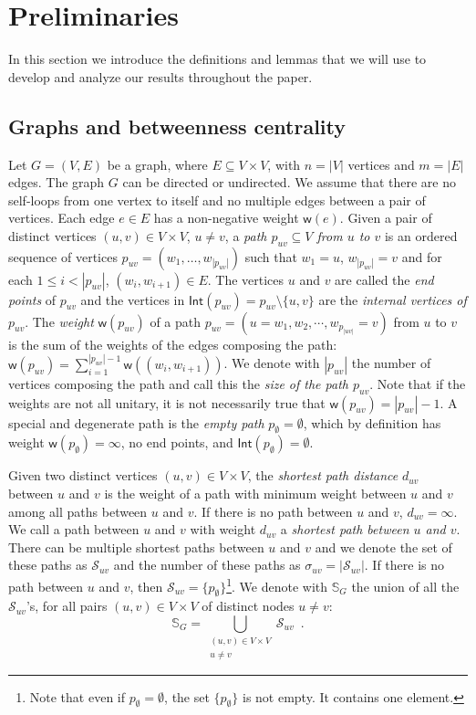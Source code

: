 \section{Preliminaries}\label{sec:prelims}
In this section we introduce the definitions and lemmas that we will use to
develop and analyze our results throughout the paper.

\subsection{Graphs and betweenness centrality}\label{sec:graphprelims}
Let $G=(V,E)$ be a graph, where $E\subseteq V\times V$, with $n=|V|$ vertices
and $m=|E|$ edges. The graph $G$ can be directed or undirected. We assume that
there are no self-loops from one vertex to itself and no multiple edges between
a pair of vertices. Each edge $e\in E$ has a non-negative weight
$\mathsf{w}(e)$. Given a pair of distinct vertices $(u,v)\in V\times V$,
$u\neq v$, a \emph{path $p_{uv}\subseteq V$ from $u$ to $v$} is an ordered sequence of
vertices $p_{uv}=(w_1,\dotsc,w_{|p_{uv}|})$ such that $w_1=u$, $w_{|p_{uv}|}=v$ and
for each $1\le i < |p_{uv}|$, $(w_i,w_{i+1})\in E$. The vertices $u$ and $v$ are
called the \emph{end points} of $p_{uv}$ and the vertices in
$\mathsf{Int}(p_{uv})=p_{uv}\setminus\{u,v\}$ are the \emph{internal vertices of
$p_{uv}$}. The \emph{weight}
$\mathsf{w}(p_{uv})$ of a path $p_{uv}=(u=w_1,w_2,\cdots,w_{p_{|uv|}}=v)$ from
$u$ to $v$ is the sum of the weights of the edges composing the path:
$\mathsf{w}(p_{uv})=\sum_{i=1}^{|p_{uv}|-1}\mathsf{w}((w_i,w_{i+1}))$. We denote with
$|p_{uv}|$ the number of vertices composing the path and call this the
\emph{size of the path $p_{uv}$}. Note that if the weights are not all unitary,
it is not necessarily true that $\mathsf{w}(p_{uv})=|p_{uv}|-1$. A special and
degenerate path is the \emph{empty path} $p_{\emptyset}=\emptyset$, which by
definition has weight $\mathsf{w}(p_\emptyset)=\infty$, no end points, and
$\mathsf{Int}(p_\emptyset)=\emptyset$.

Given two distinct vertices $(u,v)\in V\times V$, the \emph{shortest path distance}
$d_{uv}$ between $u$ and $v$ is the weight of a path with minimum weight 
between $u$ and $v$ among all paths between $u$ and $v$. If there is no path
between $u$ and $v$, $d_{uv}=\infty$. We call a path between $u$ and $v$ with
weight $d_{uv}$ a \emph{shortest path between $u$ and $v$}. There can be
multiple shortest paths between $u$ and $v$ and we denote the set of these paths
as $\mathcal{S}_{uv}$ and the number of these paths as
$\sigma_{uv}=|\mathcal{S}_{uv}|$. If there is no path between $u$ and $v$, then
$\mathcal{S}_{uv}=\{p_\emptyset\}$\footnote{Note that even if
$p_\emptyset=\emptyset$, the set $\{p_\emptyset\}$ is not empty. It contains
one element.}.
We denote with $\mathbb{S}_G$ the union of all the $\mathcal{S}_{uv}$'s, for all
pairs $(u,v)\in V\times V$ of distinct nodes $u\neq v$: 
\[ \mathbb{S}_G=\bigcup_{\substack{(u,v)\in V\times V \\ u\neq v}}\mathcal{S}_{uv}\enspace.\]


